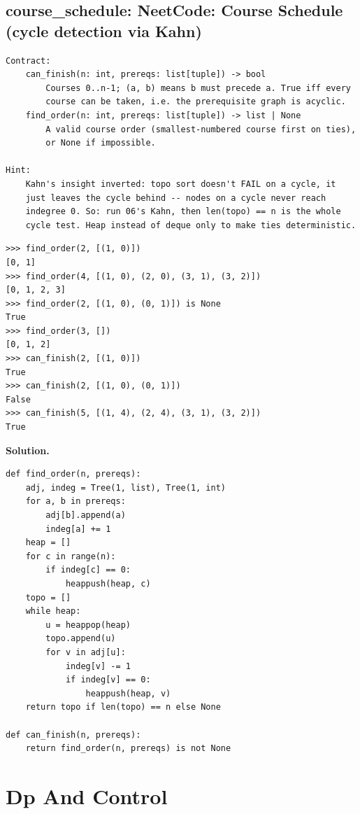 \documentclass[10pt,letterpaper]{book}
\begin{document}
\section{course\_schedule: NeetCode: Course Schedule (cycle detection via Kahn)}
\begin{lstlisting}[style=ex]
Contract:
    can_finish(n: int, prereqs: list[tuple]) -> bool
        Courses 0..n-1; (a, b) means b must precede a. True iff every
        course can be taken, i.e. the prerequisite graph is acyclic.
    find_order(n: int, prereqs: list[tuple]) -> list | None
        A valid course order (smallest-numbered course first on ties),
        or None if impossible.

Hint:
    Kahn's insight inverted: topo sort doesn't FAIL on a cycle, it
    just leaves the cycle behind -- nodes on a cycle never reach
    indegree 0. So: run 06's Kahn, then len(topo) == n is the whole
    cycle test. Heap instead of deque only to make ties deterministic.
\end{lstlisting}
\begin{lstlisting}[style=ex]
>>> find_order(2, [(1, 0)])
[0, 1]
>>> find_order(4, [(1, 0), (2, 0), (3, 1), (3, 2)])
[0, 1, 2, 3]
>>> find_order(2, [(1, 0), (0, 1)]) is None
True
>>> find_order(3, [])
[0, 1, 2]
>>> can_finish(2, [(1, 0)])
True
>>> can_finish(2, [(1, 0), (0, 1)])
False
>>> can_finish(5, [(1, 4), (2, 4), (3, 1), (3, 2)])
True
\end{lstlisting}
\noindent\textbf{Solution.}
\begin{lstlisting}[style=code]
def find_order(n, prereqs):
    adj, indeg = Tree(1, list), Tree(1, int)
    for a, b in prereqs:
        adj[b].append(a)
        indeg[a] += 1
    heap = []
    for c in range(n):
        if indeg[c] == 0:
            heappush(heap, c)
    topo = []
    while heap:
        u = heappop(heap)
        topo.append(u)
        for v in adj[u]:
            indeg[v] -= 1
            if indeg[v] == 0:
                heappush(heap, v)
    return topo if len(topo) == n else None

def can_finish(n, prereqs):
    return find_order(n, prereqs) is not None
\end{lstlisting}
\chapter{Dp And Control}
\end{document}
